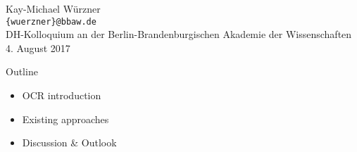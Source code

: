 \documentclass{bbawslides}
\begin{document}
\providecommand{\Title}{}


\begin{bbawtitle}
  \vspace*{3em}%
  Kay-Michael Würzner\\[-.25em]%
  \textcolor{urlColor}{\texttt{{\small\{wuerzner\}@bbaw.de}}}
  \\[3em]
  {\footnotesize{%
    DH-Kolloquium an der Berlin-Brandenburgischen Akademie der Wissenschaften\\%
    4. August 2017\\%
  }}
\end{bbawtitle}
\slideStyleFrame

\begin{bbawslide}{Outline}
  \vspace*{7mm}%
  \centerslidestrue%
  \begin{itemize}
  \item OCR introduction
  \item Existing approaches
  \item Discussion \& Outlook
  \end{itemize}
\end{bbawslide}
\end{document}
